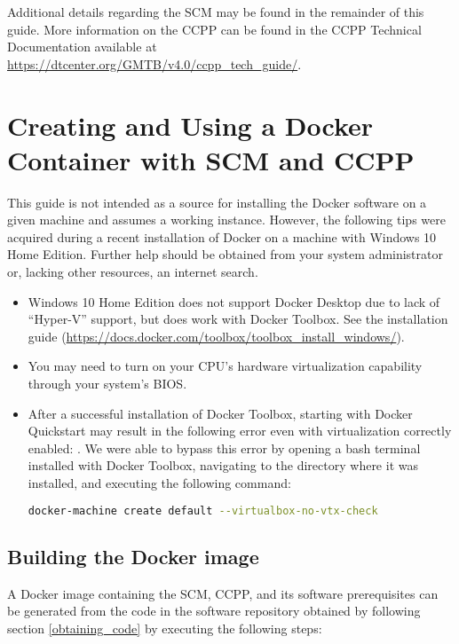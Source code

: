 Additional details regarding the SCM may be found in the remainder of this guide. More information on the CCPP can be found in the CCPP Technical Documentation available at \url{https://dtcenter.org/GMTB/v4.0/ccpp\_tech\_guide/}.

\section{Creating and Using a Docker Container with SCM and CCPP}
\label{docker}

This guide is not intended as a source for installing the Docker software on a given machine and assumes a working instance. However, the following tips were acquired during a recent installation of Docker on a machine with Windows 10 Home Edition. Further help should be obtained from your system administrator or, lacking other resources, an internet search.

\begin{itemize}
\item Windows 10 Home Edition does not support Docker Desktop due to lack of ``Hyper-V'' support, but does work with Docker Toolbox. See the installation guide (\url{https://docs.docker.com/toolbox/toolbox_install_windows/}).
\item You may need to turn on your CPU's hardware virtualization capability through your system's BIOS.
\item After a successful installation of Docker Toolbox, starting with Docker Quickstart may result in the following error even with virtualization correctly enabled: . We were able to bypass this error by opening a bash terminal installed with Docker Toolbox, navigating to the directory where it was installed, and executing the following command:
\begin{lstlisting}[language=bash]
docker-machine create default --virtualbox-no-vtx-check
\end{lstlisting}
\end{itemize}

\subsection{Building the Docker image}

A Docker image containing the SCM, CCPP, and its software prerequisites can be generated from the code in the software repository obtained by following section \ref{obtaining_code} by executing the following steps:

